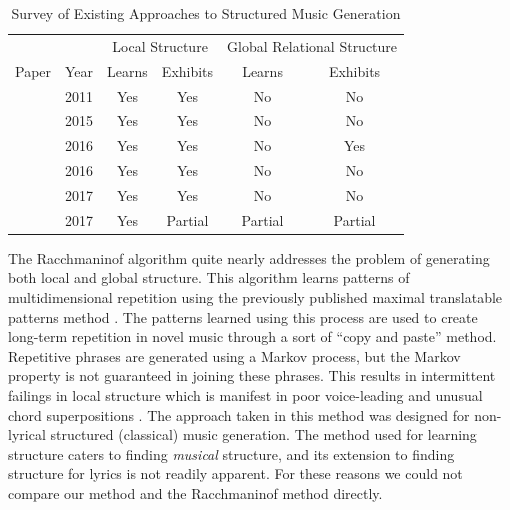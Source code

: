 \documentclass[phd,electronic,oneside,twosidetoc,letterpaper,chaptercenter,parttop,lof,lot]{byumsphd}
\begin{document}
\begin{table}[h]
\centering
\begin{tabular}{@{}lc|cc|cc|@{}}
      &      & \multicolumn{2}{c|}{Local Structure} & \multicolumn{2}{c|}{Global Relational Structure} \\ 
Paper & Year & Learns          & Exhibits         & Learns          & Exhibits          \\ \midrule
\citet{pachet2011finite}  & 2011 & Yes              & Yes                & No              & No                 \\
\citet{papadopoulos2015exact}  & 2015 & Yes              & Yes                & No              &  No           \\
 \citet{roy2016enforcing}  & 2016 & Yes              & Yes                & No              & Yes                 \\
  \citet{Jaques2016}  & 2016 & Yes             & Yes                & No              & No                 \\
\citet{perez2017mdds}  & 2017 & Yes              & Yes                & No              & No                 \\ 
\citet{collins2017computer}  & 2017 & Yes              & Partial                & Partial              & Partial        \\
\end{tabular}
\caption{Survey of Existing Approaches to Structured Music Generation}
\label{tab:systems}
\end{table}

The Racchmaninof algorithm \cite{collins2017computer} quite nearly addresses the problem of generating both local and global structure. This algorithm learns patterns of multidimensional repetition using the previously published maximal translatable patterns method \cite{meredith2002algorithms}. The patterns learned using this process are used to create long-term repetition in novel music through a sort of ``copy and paste'' method. Repetitive phrases are generated using a Markov process, but the Markov property is not guaranteed in joining these phrases. This results in intermittent failings in local structure which is manifest in poor voice-leading and unusual chord superpositions \cite{collins2017computer}. The approach taken in this method was designed for non-lyrical structured (classical) music generation. The method used for learning structure caters to finding \emph{musical} structure, and its extension to finding structure for lyrics is not readily apparent. For these reasons we could not compare our method and the Racchmaninof method directly.
\end{document}
